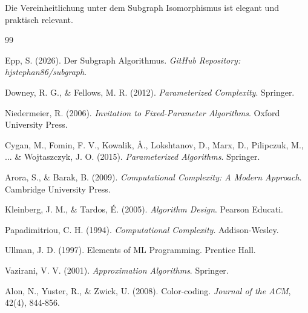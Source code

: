 ﻿\documentclass[a4paper,12pt]{article}
\theoremstyle{definition}
\begin{document}
Die Vereinheitlichung unter dem Subgraph Isomorphismus ist elegant und praktisch relevant.


\begin{thebibliography}{99}

 Epp, S. (2026). Der Subgraph Algorithmus. \emph{GitHub Repository: hjstephan86/subgraph}.

 Downey, R. G., \& Fellows, M. R. (2012). \emph{Parameterized Complexity}. Springer.

 Niedermeier, R. (2006). \emph{Invitation to Fixed-Parameter Algorithms}. Oxford University Press.

 Cygan, M., Fomin, F. V., Kowalik, Å., Lokshtanov, D., Marx, D., Pilipczuk, M., ... \& Wojtaszczyk, J. O. (2015). \emph{Parameterized Algorithms}. Springer.

 Arora, S., \& Barak, B. (2009). \emph{Computational Complexity: A Modern Approach}. Cambridge University Press.

 Kleinberg, J. M., \& Tardos, É. (2005). \emph{Algorithm Design}. Pearson Educati.

 Papadimitriou, C. H. (1994). \emph{Computational Complexity}. Addison-Wesley.

 Ullman, J. D. (1997). Elements of ML Programming. Prentice Hall.

 Vazirani, V. V. (2001). \emph{Approximation Algorithms}. Springer.

 Alon, N., Yuster, R., \& Zwick, U. (2008). Color-coding. \emph{Journal of the ACM}, 42(4), 844-856.

\end{thebibliography}
\end{document}
